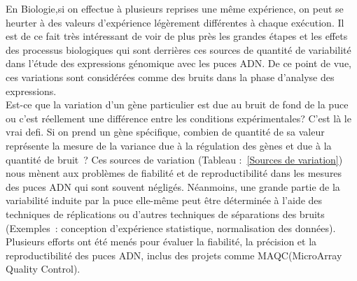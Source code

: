 \documentclass[a4paper,10pt]{article}
\begin{document}
En Biologie,si on effectue à plusieurs reprises une même expérience, on peut se heurter à des valeurs d’expérience légèrement différentes à chaque exécution.
Il est de ce fait très intéressant de voir de plus près les grandes étapes et les effets des processus biologiques qui sont derrières ces sources de quantité de variabilité dans l’étude des expressions génomique avec les puces ADN.
De ce point de vue, ces variations sont considérées comme des bruits dans la phase d’analyse des expressions.\\
Est-ce que la variation d’un gène particulier est due au bruit de fond de la puce ou c’est réellement une différence entre les conditions expérimentales? C’est là le vrai defi. 
Si on prend un gène spécifique, combien de quantité de sa valeur représente la mesure de la variance due à la régulation des gènes et due à la quantité de bruit ?
Ces sources de variation (Tableau :~\ref{Sources de variation}\cite{miller2002optimal}) nous mènent aux problèmes de fiabilité et de reproductibilité dans les mesures des puces ADN qui sont souvent négligés.
Néanmoins, une grande partie de la variabilité induite par la puce elle-même  peut être déterminée à l'aide des techniques 
de réplications ou d’autres techniques de séparations des bruits (Exemples : conception d’expérience statistique, normalisation des données).
Plusieurs efforts ont été menés pour évaluer la fiabilité, la précision et la reproductibilité des puces ADN, inclus des projets comme MAQC(MicroArray Quality Control\cite{shi2006microarray}). \\
\end{document}
